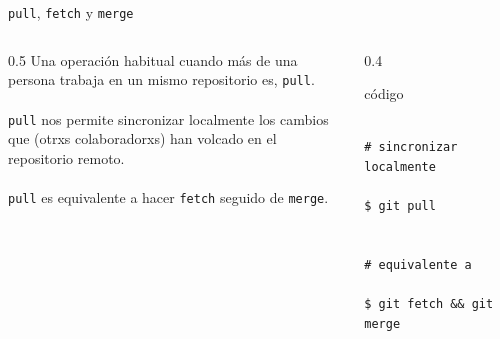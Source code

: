 \documentclass{beamer}
\begin{document}
\begin{frame}[fragile]{\texttt{pull}, \texttt{fetch} y \texttt{merge}}
    \begin{columns}[T]
        \begin{column}{0.5\textwidth}
            Una operación habitual cuando más de una
            persona trabaja en un mismo repositorio es,
            \texttt{pull}. \\~\\
            \texttt{pull} nos permite sincronizar 
            localmente los cambios que (otrxs colaboradorxs) 
            han volcado en el repositorio remoto. \\~\\
            \texttt{pull} es equivalente a hacer \texttt{fetch}
            seguido de \texttt{merge}. 
        \end{column}
        \begin{column}{0.4\textwidth}
            \begin{exampleblock}{código}
                \scriptsize
                \begin{verbatim}
                    # sincronizar localmente
                    $ git pull

                    # equivalente a 
                    $ git fetch && git merge
                \end{verbatim}
            \end{exampleblock}
        \end{column}
    \end{columns}
\end{frame}

\end{document}
